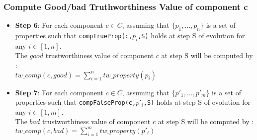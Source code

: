 \documentclass{beamer}
\begin{document}
\begin{frame}[fragile]
	\frametitle{Compute Good/bad Truthworthiness Value of component c}
	\begin{itemize}
		\item {\bf Step 6}: For each component $c \in C$, assuming that $\{p_1,...,p_n\}$ is a set of properties such that {\tt compTrueProp(c,$p_i$,S)} holds at step S of evolution for any $i \in [1,n]$. \\ 
		The $good$ trustworthiness value of component $c$ at step S will be computed by :\\
		$tw\_comp(c,good) = \sum_{i=1}^{n}tw\_property(p_i)$
		\item {\bf Step 7}: For each component $c \in C$, assuming that $\{p'_1,...,p'_m\}$ is a set of properties such that {\tt compFalseProp(c,$p'_i$,S)} holds at step S of evolution for any $i \in [1,m]$. \\ 
		The $bad$ trustworthiness value of component $c$ at step S will be computed by :\\
		$tw\_comp(c,bad) = \sum_{i=1}^{m}tw\_property(p'_i)$    
	\end{itemize}
\end{frame}
\end{document}
